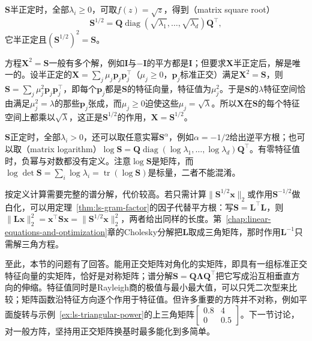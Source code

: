 $\bm S$半正定时，全部$\lambda_i\geq0$，可取$f(z)=\sqrt z$，得到（matrix square root）
\[
 \bm S^{1/2}=\bm Q\operatorname{diag}(\sqrt{\lambda_1},\ldots,\sqrt{\lambda_d})\bm Q^\top ,
\]
它半正定且$(\bm S^{1/2})^2=\bm S$。

方程$\bm X^2=\bm S$一般有多个解，例如$\bm I$与$-\bm I$的平方都是$\bm I$；但要求$\bm X$半正定后，解是唯一的。设半正定的$\bm X=\sum_j\mu_j\bm p_j\bm p_j^\top$（$\mu_j\geq0$，$\bm p_j$标准正交）满足$\bm X^2=\bm S$，则$\bm S=\sum_j\mu_j^2\bm p_j\bm p_j^\top$，即每个$\bm p_j$都是$\bm S$的特征向量，特征值为$\mu_j^2$。于是$\bm S$的$\lambda$特征空间恰由满足$\mu_j^2=\lambda$的那些$\bm p_j$张成，而$\mu_j\geq0$迫使这些$\mu_j=\sqrt\lambda$。所以$\bm X$在$\bm S$的每个特征空间上都乘以$\sqrt\lambda$，这正是$\bm S^{1/2}$的作用，$\bm X=\bm S^{1/2}$。

$\bm S$正定时，全部$\lambda_i>0$，还可以取任意实幂$\bm S^\alpha$，例如$\alpha=-1/2$给出逆平方根；也可以取（matrix logarithm）$\log\bm S=\bm Q\operatorname{diag}(\log\lambda_1,\ldots,\log\lambda_d)\bm Q^\top$。有零特征值时，负幂与对数都没有定义。注意$\log\bm S$是矩阵，而$\log\det\bm S=\sum_i\log\lambda_i=\operatorname{tr}(\log\bm S)$是标量，二者不能混淆。

按定义计算需要完整的谱分解，代价较高。若只需计算$\lVert\bm S^{1/2}\bm x\rVert_2$或作用$\bm S^{-1/2}$做白化，可以用定理~\ref{thm:ls-gram-factor}的因子代替平方根：写$\bm S=\bm L^\top\bm L$，则$\lVert\bm L\bm x\rVert_2^2=\bm x^\top\bm S\bm x=\lVert\bm S^{1/2}\bm x\rVert_2^2$，两者给出同样的长度。第~\ref{chap:linear-equations-and-optimization}章的Cholesky分解把$\bm L$取成三角矩阵，那时作用$\bm L^{-1}$只需解三角方程。

至此，本节的问题有了回答。能用正交矩阵对角化的实矩阵，即具有一组标准正交特征向量的实矩阵，恰好是对称矩阵；谱分解$\bm S=\bm Q\bm\Lambda\bm Q^\top$把它写成沿互相垂直方向的伸缩。特征值同时是Rayleigh商的极值与最小最大值，可以只凭二次型来比较；矩阵函数沿特征方向逐个作用于特征值。但许多重要的方阵并不对称，例如平面旋转与示例~\ref{ex:ls-triangular-power}的上三角矩阵$\left[\begin{smallmatrix}0.8&4\\0&0.5\end{smallmatrix}\right]$。下一节讨论，对一般方阵，坚持用正交矩阵换基时最多能化到多简单。
